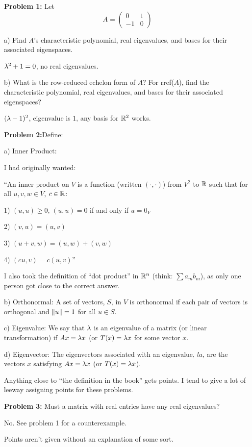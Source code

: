 \documentclass[a4paper,12pt]{article}
\begin{document}
{\Large{\bf Problem 1:}} Let \[ A= \left( \begin{array}{ccc}0 & 1 \\ -1 & 0\end{array} \right)\]

a) Find $A$'s characteristic polynomial, real eigenvalues, and bases for their associated eigenspaces.

$\lambda^2 +1 =0$, no real eigenvalues.

b) What is the row-reduced echelon form of $A$? For rref($A$), find the characteristic polynomial, real eigenvalues, and bases for their associated eigenspaces?

$(\lambda -1)^2$, eigenvalue is $1$, any basis for $\mathbb{R}^2$ works. 
\shunt

{\Large{\bf Problem 2:}}Define:

a) Inner Product:

I had originally wanted:

``An inner product on $V$ is a function (written $(\cdot, \cdot)$) from $V^2$ to $\mathbb{R}$ such that for all $u,v,w \in V$, $c \in \mathbb{R}$:

1) $(u,u) \geq 0$, $(u,u)=0$ if and only if $u = 0_V$

2) $(v,u) = (u,v)$

3) $(u+v,w) = (u,w) + (v,w)$

4) $(cu,v) = c(u,v)$''

I also took the definition of ``dot product'' in $\mathbb{R}^n$ (think: $\sum a_mb_m$), as only one person got close to the correct answer.

b) Orthonormal: A set of vectors, $S$, in $V$ is orthonormal if each pair of vectors is orthogonal and $\|u\| = 1$ for all $u \in S$.

c) Eigenvalue: We say that $\lambda$ is an eigenvalue of a matrix (or linear transformation) if $Ax=\lambda x$ (or $T(x) = \lambda x$ for some vector $x$.

d) Eigenvector: The eigenvectors associated with an eigenvalue, $la$, are the vectors $x$ satisfying $Ax=\lambda x$ (or $T(x) = \lambda x$).

Anything close to ``the definition in the book'' gets points. I tend to give a lot of leeway assigning points for these problems.

\shunt

{\Large{\bf Problem 3:}} Must a matrix with real entries have any real eigenvalues? 

No. See problem 1 for a counterexample.

Points aren't given without an explanation of some sort.
\end{document}
